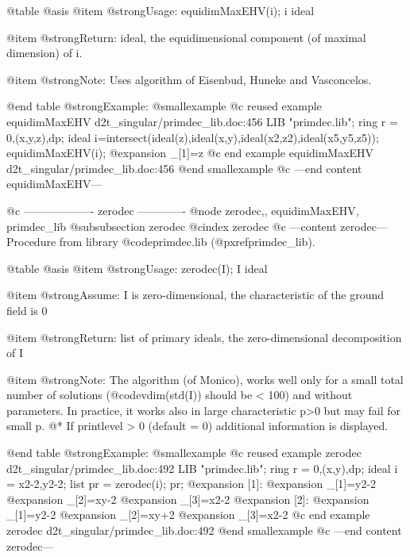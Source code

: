 @table @asis
@item @strong{Usage:}
equidimMaxEHV(i); i ideal

@item @strong{Return:}
ideal, the equidimensional component (of maximal dimension) of i.

@item @strong{Note:}
Uses algorithm of Eisenbud, Huneke and Vasconcelos.

@end table
@strong{Example:}
@smallexample
@c reused example equidimMaxEHV d2t_singular/primdec_lib.doc:456 
LIB "primdec.lib";
ring  r = 0,(x,y,z),dp;
ideal i=intersect(ideal(z),ideal(x,y),ideal(x2,z2),ideal(x5,y5,z5));
equidimMaxEHV(i);
@expansion{} _[1]=z
@c end example equidimMaxEHV d2t_singular/primdec_lib.doc:456
@end smallexample
@c ---end content equidimMaxEHV---

@c ------------------- zerodec -------------
@node zerodec,, equidimMaxEHV, primdec_lib
@subsubsection zerodec
@cindex zerodec
@c ---content zerodec---
Procedure from library @code{primdec.lib} (@pxref{primdec_lib}).

@table @asis
@item @strong{Usage:}
zerodec(I); I ideal

@item @strong{Assume:}
I is zero-dimensional, the characteristic of the ground field is 0

@item @strong{Return:}
list of primary ideals, the zero-dimensional decomposition of I

@item @strong{Note:}
The algorithm (of Monico), works well only for a small total number
of solutions (@code{vdim(std(I))} should be < 100) and without
parameters. In practice, it works also in large characteristic p>0
but may fail for small p.
@* If printlevel > 0 (default = 0) additional information is displayed.

@end table
@strong{Example:}
@smallexample
@c reused example zerodec d2t_singular/primdec_lib.doc:492 
LIB "primdec.lib";
ring r  = 0,(x,y),dp;
ideal i = x2-2,y2-2;
list pr = zerodec(i);
pr;
@expansion{} [1]:
@expansion{}    _[1]=y2-2
@expansion{}    _[2]=xy-2
@expansion{}    _[3]=x2-2
@expansion{} [2]:
@expansion{}    _[1]=y2-2
@expansion{}    _[2]=xy+2
@expansion{}    _[3]=x2-2
@c end example zerodec d2t_singular/primdec_lib.doc:492
@end smallexample
@c ---end content zerodec---
